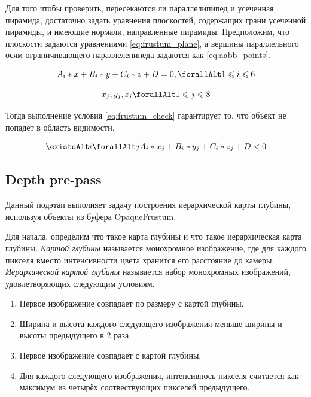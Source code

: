 		Для того чтобы проверить, пересекаются ли параллелипипед и усеченная пирамида, достаточно задать уравнения плоскостей, содержащих грани усеченной пирамиды, и имеющие нормали, направленные  пирамиды. Предположим, что плоскости задаются уравнениями \ref{eq:frustum_plane}, а вершины параллельного осям ограничивающего параллелепипеда задаются как \ref{eq:aabb_points}.
		
		\begin{equation} %
			\label{eq:frustum_plane}
			\begin{multlined}
				A_i * x + B_i * y + C_i * z + D = 0, \forallAlt 1 \le i \le 6 
			\end{multlined}
		\end{equation}
		
		\begin{equation} %
			\label{eq:aabb_points}
			\begin{multlined}
				{x_j, y_j, z_j} \forallAlt 1 \le j \le 8 
			\end{multlined}
		\end{equation}
		
		Тогда выполнение условия \ref{eq:frustum_check} гарантирует то, что объект не попадёт в область видимости.
		
		\begin{equation} %
			\label{eq:frustum_check}
			\begin{multlined}
				\existsAlt i  \forallAlt j A_i * x_j + B_i * y_j + C_i * z_j + D < 0
			\end{multlined}
		\end{equation}
				
	\subsection{Depth pre-pass} \label{ch3:pre_pass:depth}
		Данный подэтап выполняет задачу построения иерархической карты глубины, используя объекты из буфера OpaqueFrustum.
		
		Для начала, определим что такое карта глубины и что такое иерархическая карта глубины. \textit{Картой глубины} называется монохромное изображение, где для каждого пикселя вместо интенсивности цвета хранится его расстояние до камеры.  \textit{Иерархической картой глубины} называется набор монохромных изображений, удовлетворяющих следующим условиям.
		\begin{enumerate}[1.]
			\item Первое изображение совпадает по размеру с картой глубины.
			\item Ширина и высота каждого следующего изображения меньше ширины и высоты предыдущего в 2 раза.
			\item Первое изображение совпадает с картой глубины.
			\item Для каждого следующего изображения, интенсивнось пикселя считается как максимум из четырёх соотвествующих пикселей предыдущего.
		\end{enumerate}
	
